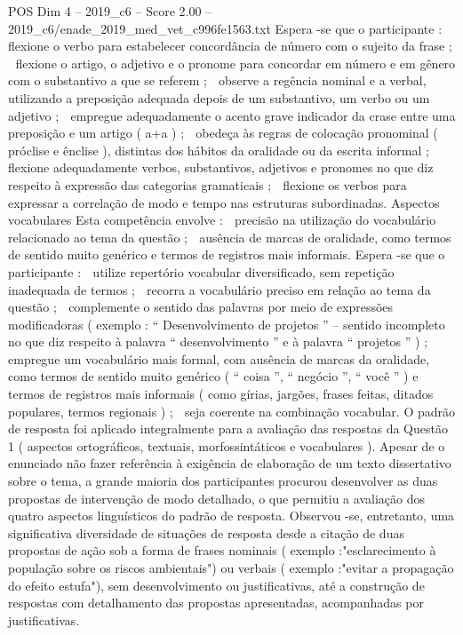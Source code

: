 \begin{textsample}{POS Dim 4 – 2019\_c6 – Score 2.00 – 2019\_c6/enade\_2019\_med\_vet\_c996fe1563.txt}
Espera -se que o participante :  flexione o verbo para estabelecer concordância de número com o sujeito da frase ;  flexione o artigo, o adjetivo e o pronome para concordar em número e em gênero com o substantivo a que se referem ;  observe a regência nominal e a verbal, utilizando a preposição adequada depois de um substantivo, um verbo ou um adjetivo ;  empregue adequadamente o acento grave indicador da crase entre uma preposição e um artigo ( a+a ) ;  obedeça às regras de colocação pronominal ( próclise e ênclise ), distintas dos hábitos da oralidade ou da escrita informal ;  flexione adequadamente verbos, substantivos, adjetivos e pronomes no que diz respeito à expressão das categorias gramaticais ;  flexione os verbos para expressar a correlação de modo e tempo nas estruturas subordinadas.
Aspectos vocabulares Esta competência envolve :  precisão na utilização do vocabulário relacionado ao tema da questão ;  ausência de marcas de oralidade, como termos de sentido muito genérico e termos de registros mais informais.
Espera -se que o participante :  utilize repertório vocabular diversificado, sem repetição inadequada de termos ;  recorra a vocabulário preciso em relação ao tema da questão ;  complemente o sentido das palavras por meio de expressões modificadoras ( exemplo : “ Desenvolvimento de projetos ” – sentido incompleto no que diz respeito à palavra “ desenvolvimento ” e à palavra “ projetos ” ) ;  empregue um vocabulário mais formal, com ausência de marcas da oralidade, como termos de sentido muito genérico ( “ coisa ”, “ negócio ”, “ você ” ) e termos de registros mais informais ( como gírias, jargões, frases feitas, ditados populares, termos regionais ) ;  seja coerente na combinação vocabular.
O padrão de resposta foi aplicado integralmente para a avaliação das respostas da Questão 1 ( aspectos ortográficos, textuais, morfossintáticos e vocabulares ).
Apesar de o enunciado não fazer referência à exigência de elaboração de um texto dissertativo sobre o tema, a grande maioria dos participantes procurou desenvolver as duas propostas de intervenção de modo detalhado, o que permitiu a avaliação dos quatro aspectos linguísticos do padrão de resposta.
Observou -se, entretanto, uma significativa diversidade de situações de resposta desde a citação de duas propostas de ação sob a forma de frases nominais ( exemplo :"esclarecimento à população sobre os riscos ambientais") ou verbais ( exemplo :"evitar a propagação do efeito estufa"), sem desenvolvimento ou justificativas, até a construção de respostas com detalhamento das propostas apresentadas, acompanhadas por justificativas.

\end{textsample}
